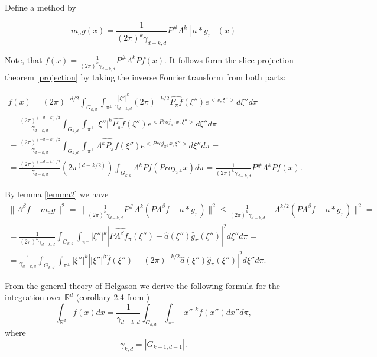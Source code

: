 \documentclass[12pt]{iopart}
\begin{document}
Define a method by 

$$m_ag(x) = \frac{1}{(2\pi)^k\gamma_{d-k,d}}P^\#\Lambda^k[a*g_\pi](x)$$

Note, that $f(x)=\frac{1}{(2\pi)^k\gamma_{d-k,d}}P^\#\Lambda^kPf(x)$. It follows form the slice-projection theorem \ref{projection} by taking the inverse Fourier transform from both parts:

\begin{multline*}
f(x) = (2\pi)^{-d/2}\int_{G_{k,d}}\int_{\pi^\perp}\frac{|\xi''|^k}{\gamma_{d-k,d}}(2\pi)^{-k/2}\widehat{P_\pi f}(\xi'')e^{<x,\xi''>}d\xi''d\pi = \\
= \frac{(2\pi)^{(-d-k)/2}}{\gamma_{d-k,d}}\int_{G_{k,d}}\int_{\pi^\perp}|\xi''|^k\widehat{P_\pi f}(\xi'')e^{<Proj_{\pi^\perp}x,\xi''>}d\xi''d\pi = \\
= \frac{(2\pi)^{(-d-k)/2}}{\gamma_{d-k,d}}\int_{G_{k,d}}\int_{\pi^\perp}\widehat{\Lambda^kP_\pi f}(\xi'')e^{<Proj_{\pi^\perp}x,\xi''>}d\xi''d\pi = \\
= \frac{(2\pi)^{(-d-k)/2}}{\gamma_{d-k,d}}(2\pi^{(d-k/2)})\int_{G_{k,d}}\Lambda^kP f(Proj_{\pi^\perp}x)d\pi = \frac{1}{(2\pi)^k\gamma_{d-k,d}}P^\#\Lambda^kPf(x).
\end{multline*}

By lemma \ref{lemma2} we have
\begin{multline*}
    \|\Lambda^\beta f-m_ag\|^2=\|\frac{1}{(2\pi)^k\gamma_{d-k,d}}P^\#\Lambda^k(P\Lambda^\beta f-a*g_\pi)\|^2\le\frac{1}{(2\pi)^k\gamma_{d-k,d}}\|\Lambda^{k/2}(P\Lambda^\beta f-a*g_\pi)\|^2=\\
    =\frac{1}{(2\pi)^k\gamma_{d-k,d}}\int_{G_{k,d}}\int_{\pi^\perp}|\xi''|^k\left|\widehat{P\Lambda^\beta f_\pi}(\xi'')-\widehat a(\xi'')\widehat g_\pi(\xi'')\right|^2d\xi'' d\pi=\\
    =\frac{1}{\gamma_{d-k,d}}\int_{G_{k,d}}\int_{\pi^\perp}|\xi''|^k\left||\xi''|^\beta\widehat{f}(\xi'')-(2\pi)^{-k/2}\widehat a(\xi'')\widehat g_\pi(\xi'')\right|^2d\xi'' d\pi.
\end{multline*}









From the general theory of Helgason \cite{H} we derive the following formula for the integration over $\mathbb R^d$ (corollary 2.4 from \cite{K})
\begin{equation}
\label{integral}
\int_{\mathbb R^d}f(x)dx=\frac{1}{\gamma_{d-k,d}}\int_{G_{k,d}}\int_{\pi^\perp}|x''|^kf(x'')dx''d\pi,
\end{equation}
where
$$
\gamma_{k,d}=|G_{k-1,d-1}|.
$$
\end{document}
